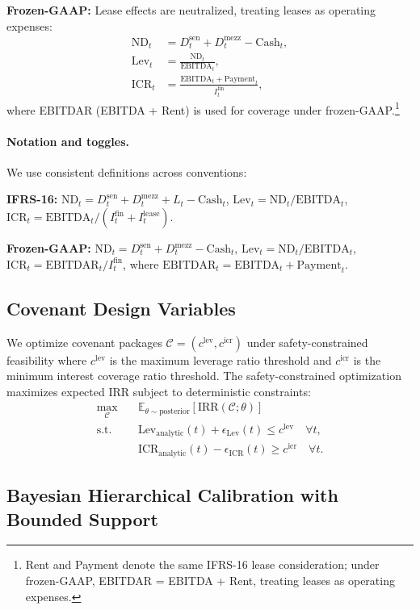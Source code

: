 \documentclass[11pt,a4paper]{article}
\newcommand{\E}{\mathbb{E}}
\newcommand{\ND}{\mathrm{ND}} %
\newcommand{\EBITDA}{\mathrm{EBITDA}}
\newcommand{\EBITDAR}{\mathrm{EBITDAR}}
\newcommand{\ICR}{\mathrm{ICR}}
\newcommand{\Lev}{\mathrm{Lev}}
\newcommand{\Ifin}{I^{\mathrm{fin}}}
\newcommand{\Ilease}{I^{\mathrm{lease}}}
\theoremstyle{plain}
\theoremstyle{definition}
\begin{document}
\textbf{Frozen-GAAP:} Lease effects are neutralized, treating leases as operating expenses:
\begin{align}
\ND_t &= D_t^{\text{sen}} + D_t^{\text{mezz}} - \text{Cash}_t, \\
\Lev_t &= \frac{\ND_t}{\EBITDA_t}, \\
\ICR_t &= \frac{\EBITDA_t + \text{Payment}_t}{\Ifin_t},
\end{align}
where EBITDAR (EBITDA + Rent) is used for coverage under frozen-GAAP.\footnote{Rent and Payment denote the same IFRS-16 lease consideration; under frozen-GAAP, EBITDAR = EBITDA + Rent, treating leases as operating expenses.}

\paragraph{Notation and toggles.}
We use consistent definitions across conventions:

\textbf{IFRS-16:} $\ND_t = D^{\mathrm{sen}}_t + D^{\mathrm{mezz}}_t + L_t - \mathrm{Cash}_t$,
$\Lev_t=\ND_t/\EBITDA_t$, $\ICR_t = \EBITDA_t/(\Ifin_t+\Ilease_t)$.

\textbf{Frozen-GAAP:} $\ND_t = D^{\mathrm{sen}}_t + D^{\mathrm{mezz}}_t - \mathrm{Cash}_t$,
$\Lev_t=\ND_t/\EBITDA_t$, $\ICR_t = \EBITDAR_t/\Ifin_t$, where $\EBITDAR_t=\EBITDA_t+\mathrm{Payment}_t$.

\subsection{Covenant Design Variables}

We optimize covenant packages $\mathcal{C} = (c^{\text{lev}}, c^{\text{icr}})$ under safety-constrained feasibility where $c^{\text{lev}}$ is the maximum leverage ratio threshold and $c^{\text{icr}}$ is the minimum interest coverage ratio threshold. The safety-constrained optimization maximizes expected IRR subject to deterministic constraints:
\begin{align}
\max_{\mathcal{C}} \quad &\E_{\theta \sim \text{posterior}}\!\left[\text{IRR}(\mathcal{C};\theta)\right] \\
\text{s.t.} \quad &\Lev_{\text{analytic}}(t) + \epsilon_{\text{Lev}}(t) \leq c^{\text{lev}} \quad \forall t, \\
&\ICR_{\text{analytic}}(t) - \epsilon_{\text{ICR}}(t) \geq c^{\text{icr}} \quad \forall t.
\end{align}

\subsection{Bayesian Hierarchical Calibration with Bounded Support}
\end{document}
